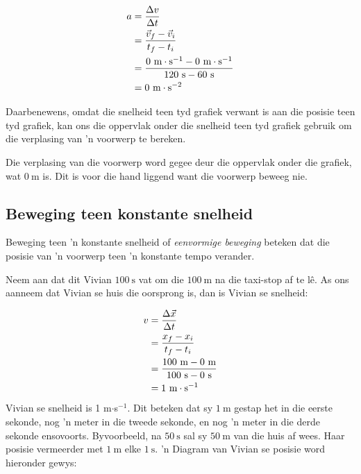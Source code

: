     \begin{align*}
    a &= \frac{\Delta v}{\Delta t}\hfill \\ 
    &= \frac{\vec{v}_{f}-\vec{v}_{i}}{{t}_{f}-{t}_{i}}\hfill \\ 
    &= \frac{0~\text{m}\cdot\text{s}^{-1}-0~\text{m}\cdot\text{s}^{-1}}{120~\text{s}-60~\text{s}}\\ 
    &= 0~\text{m}\cdot\text{s}^{-2}
      \end{align*}

Daarbenewens, omdat die snelheid teen tyd grafiek verwant is aan die posisie teen tyd grafiek, kan ons die oppervlak onder die snelheid teen tyd grafiek gebruik om die verplasing van 'n voorwerp te bereken.\par 

	\par

Die verplasing van die voorwerp word gegee deur die oppervlak onder die grafiek, wat $0~\text{m}$ is. Dit is voor die hand liggend want die voorwerp beweeg nie.\par 


\subsection*{Beweging teen konstante snelheid}
\nopagebreak
Beweging teen 'n konstante snelheid of \textsl{eenvormige beweging} beteken dat die posisie van 'n voorwerp teen 'n konstante tempo verander.\par 
Neem aan dat dit Vivian $100~\text{s}$ vat om die $100~\text{m}$ na die taxi-stop af te l\^e. As ons aanneem dat Vivian se huis die oorsprong is, dan is Vivian se snelheid:\par 
        \label{m38795*id69850}\nopagebreak\noindent{}
          
    \begin{align*}
    	v&= \frac{\Delta \vec{x}}{\Delta t}\hfill \\ 
	&= \frac{{x}_{f}-{x}_{i}}{{t}_{f}-{t}_{i}}\hfill \\ 
	&= \frac{100~\text{m}-0~\text{m}}{100~\text{s}-0~\text{s}}\\ 
	 &= 1~\text{m}\cdot{\text{s}}^{-1}
      \end{align*}
Vivian se snelheid is 1 m$\ensuremath{\cdot}$s${}^{-1}$. Dit beteken dat sy $1~\text{m}$ gestap het in die eerste sekonde, nog 'n meter in die tweede sekonde, en nog 'n meter in die derde sekonde ensovoorts. Byvoorbeeld, na $50~\text{s}$ sal sy $50~\text{m}$ van die huis af wees. Haar posisie vermeerder met $1~\text{m}$ elke $1~\text{s}$. 'n Diagram van Vivian se posisie word hieronder gewys:\par 

